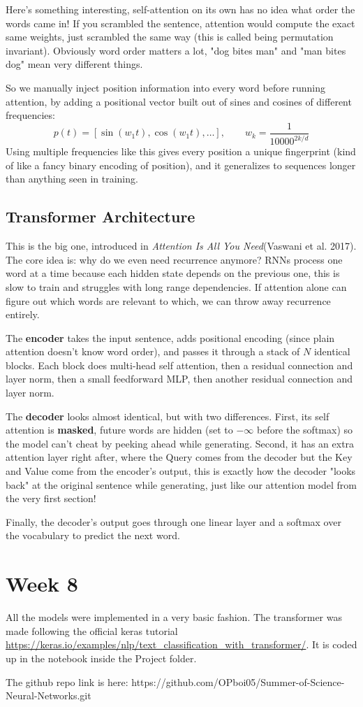 \documentclass[12pt]{article}
\begin{document}
Here's something interesting, self-attention on its own has no idea what order the words came in! If you scrambled the sentence, attention would compute the exact same weights, just scrambled the same way (this is called being permutation invariant). Obviously word order matters a lot, "dog bites man" and "man bites dog" mean very different things.

So we manually inject position information into every word before running attention, by adding a positional vector built out of sines and cosines of different frequencies:
$$p(t) = [\sin(w_1t), \cos(w_1t), \dots], \qquad w_k = \frac{1}{10000^{2k/d}}$$
Using multiple frequencies like this gives every position a unique fingerprint (kind of like a fancy binary encoding of position), and it generalizes to sequences longer than anything seen in training.

\subsection{Transformer Architecture}

This is the big one, introduced in \textit{Attention Is All You Need}(Vaswani et al. 2017). The core idea is: why do we even need recurrence anymore? RNNs process one word at a time because each hidden state depends on the previous one, this is slow to train and struggles with long range dependencies. If attention alone can figure out which words are relevant to which, we can throw away recurrence entirely.

The \textbf{encoder} takes the input sentence, adds positional encoding (since plain attention doesn't know word order), and passes it through a stack of $N$ identical blocks. Each block does multi-head self attention, then a residual connection and layer norm, then a small feedforward MLP, then another residual connection and layer norm.

The \textbf{decoder} looks almost identical, but with two differences. First, its self attention is \textbf{masked}, future words are hidden (set to $-\infty$ before the softmax) so the model can't cheat by peeking ahead while generating. Second, it has an extra attention layer right after, where the Query comes from the decoder but the Key and Value come from the encoder's output, this is exactly how the decoder "looks back" at the original sentence while generating, just like our attention model from the very first section!

Finally, the decoder's output goes through one linear layer and a softmax over the vocabulary to predict the next word.

\section{Week 8}
All the models were implemented in a very basic fashion. The transformer was made following the official keras tutorial \url{https://keras.io/examples/nlp/text_classification_with_transformer/}. It is coded up in the notebook inside the Project folder. 

The github repo link is here: {https://github.com/OPboi05/Summer-of-Science-Neural-Networks.git}

\printbibliography
\end{document}
